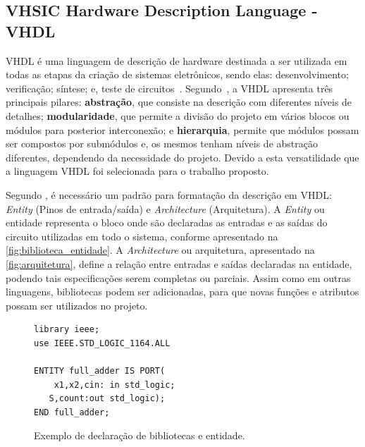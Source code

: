 
\subsection{\label{sec:vhdl_seção}VHSIC Hardware Description Language - VHDL}
VHDL é uma linguagem de descrição de hardware destinada a ser utilizada em todas as etapas da criação de sistemas eletrônicos, sendo elas: desenvolvimento; verificação; síntese; e, teste de circuitos~\cite{IEEEVHDLLanguage}.
% 
Segundo~, a VHDL apresenta três principais pilares: \textbf{abstração}, que consiste na descrição com diferentes níveis de detalhes; \textbf{modularidade}, que permite a divisão do projeto em vários blocos ou módulos para posterior interconexão; e \textbf{hierarquia}, permite que módulos possam ser compostos por submódulos e, os mesmos tenham níveis de abstração diferentes, dependendo da necessidade do projeto. Devido a esta versatilidade que a linguagem VHDL foi selecionada para o trabalho proposto.

\par
Segundo , é necessário um padrão para formatação da descrição em VHDL: \textit{Entity} (Pinos de entrada/saída) e \textit{Architecture} (Arquitetura). A \textit{Entity} ou entidade representa o bloco onde são declaradas as entradas e as saídas do circuito utilizadas em todo o sistema, conforme apresentado na \autoref{fig:biblioteca_entidade}. A \textit{Architecture} ou arquitetura, apresentado na \autoref{fig:arquitetura}, define a relação entre entradas e saídas declaradas na entidade, podendo tais especificações serem completas ou parciais. Assim como em outras linguagens, bibliotecas podem ser adicionadas, para que novas funções e atributos possam ser utilizados no projeto.

\begin{figure}[H]
\caption{\label{fig:biblioteca_entidade} Exemplo de declaração de bibliotecas e entidade.}
	\begin{center}
    \begin{minipage}{0.6\textwidth}
    \begin{lstlisting}       
library ieee;
use IEEE.STD_LOGIC_1164.ALL

ENTITY full_adder IS PORT(
	x1,x2,cin: in std_logic;
   S,count:out std_logic);
END full_adder;
\end{lstlisting}
    \end{minipage}
	\end{center}
\end{figure}

